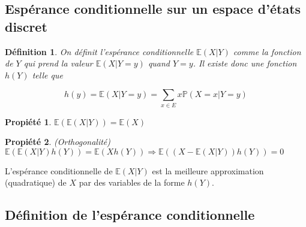 \documentclass[10pt,a4paper,oneside]{article}
\newtheorem{definition}{Définition}
\newtheorem{propiete}{Propiété}
\begin{document}
\subsection{Espérance conditionnelle sur un espace d'états discret}

\begin{definition}
On définit l'espérance conditionnelle $\mathbb{E}(X | Y)$ comme la fonction de $Y$ qui prend la valeur $\mathbb{E}(X | Y = y)$ quand $Y = y$. Il existe donc une fonction $h(Y)$ telle que

\[ h(y) = \mathbb{E}(X | Y = y) = \sum_{x \in E} x \mathbb{P}(X = x | Y = y) \]
\end{definition}

\begin{propiete}
$\mathbb{E}(\mathbb{E}(X | Y)) = \mathbb{E}(X)$
\end{propiete}

\begin{propiete}(Orthogonalité)
$\mathbb{E}( \mathbb{E}(X | Y) h(Y) ) = \mathbb{E}(X h(Y)) \Rightarrow \mathbb{E}((X - \mathbb{E}(X | Y)) h(Y)) = 0$
\end{propiete}

L'espérance conditionnelle de $\mathbb{E}(X | Y)$ est la meilleure approximation (quadratique) de $X$ par des variables de la forme $h(Y)$.

\subsection{Définition de l'espérance conditionnelle}
\end{document}
